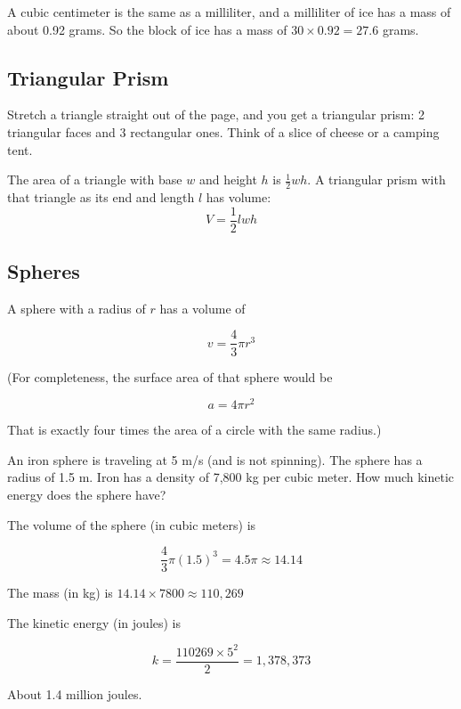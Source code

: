 A cubic centimeter is the same as a milliliter, and a milliliter of ice
has a mass of about 0.92 grams. So the block of ice has a mass of
$30 \times 0.92 = 27.6$ grams. 
\subsection{Triangular Prism}
Stretch a triangle straight out of the page, and you get a triangular
prism: 2 triangular faces and 3 rectangular ones. Think of a slice of
cheese or a camping tent.
\begin{mdframed}[style=important, frametitle={Volume of a triangular prism.}]
The area of a triangle with base $w$ and height $h$ is $\frac{1}{2}wh$.
A triangular prism with that triangle as its end and length $l$ has volume:
$$V = \frac{1}{2}lwh$$
\end{mdframed}


\subsection{Spheres}
\begin{mdframed}[style=important, frametitle={Volume of a Sphere}]

A sphere with a radius of $r$ has a volume of 

$$v = \frac{4}{3} \pi r^3$$

(For completeness, the surface area of that sphere would be

$$a  = 4 \pi r^2$$

That is exactly four times the area of a circle with the same radius.)

\end{mdframed}

\begin{Exercise}[title={Flying Sphere}, label=flying_sphere]

An iron sphere is traveling at 5 m/s (and is not spinning).  The
sphere has a radius of 1.5 m.  Iron has a density of 7,800 kg per
cubic meter.  How much kinetic energy does the sphere have?
\end{Exercise}
\begin{Answer}[ref=flying_sphere]
  The volume of the sphere (in cubic meters) is

  $$\frac{4}{3}\pi (1.5)^3 = 4.5 \pi \approx 14.14$$

  The mass (in kg) is $14.14 \times 7800 \approx 110,269$

  The kinetic energy (in joules) is

  $$k = \frac{110269 \times 5^2}{2} = 1,378,373$$

  About 1.4 million joules.
\end{Answer}

